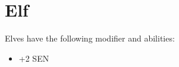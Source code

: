 \chapter{Elf}\label{elf}

Elves have the following modifier and abilities:
\begin{itemize}
    \item +2 SEN
\end{itemize}
